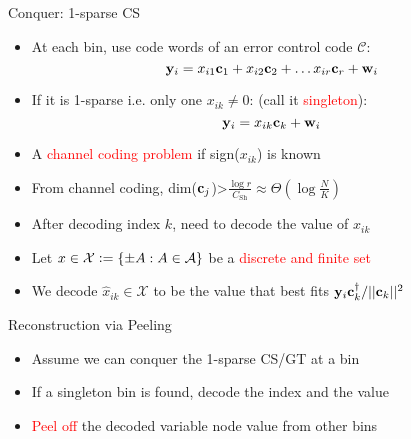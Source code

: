 \documentclass[final]{beamer}
\newlength{\twocolwid}
\newlength{\blockskip}
\begin{document}
\begin{frame}
\begin{columns}[t]
\begin{column}{\twocolwid}
    \begin{block}{\Large Conquer: 1-sparse CS}
	    \begin{itemize}
    		\item At each bin, use code words of an error control code $\mathcal{C}$:
		    	\begin{equation*}
				    \mathbf{y}_i=x_{i1}\mathbf{c}_1 +x_{i2}\mathbf{c}_{2}+\ldots x_{ir}\mathbf{c}_{r}+\mathbf{w}_i
			    \end{equation*}
    		\item If it is 1-sparse i.e. only one $x_{ik}\neq 0$: (call it \textcolor{red}{singleton}):
		        \begin{equation*}
				    \mathbf{y}_i=x_{ik}\mathbf{c}_k +\mathbf{w}_i
		        \end{equation*}
		    \item A \textcolor{red}{channel coding problem} if sign($x_{ik}$) is known
		    \item  From channel coding, dim($\mathbf{c}_j$)>$\frac{\log r}{C_{\text{Sh}}}\approx \Theta(\log \frac{N}{K})$ 
           \item After decoding index $k$, need to decode the value of $x_{ik}$
		    \item Let $x\in\mathcal{X}\mathrel{\mathop:}=\{\pm A: A\in \mathcal{A}\}$ be a \textcolor{red}{discrete and finite set}
		    \item We decode $\hat{x}_{ik}\in\mathcal{X}$ to be the value that best fits $\mathbf{y}_i\mathbf{c}_{k}^{\dagger}/||\mathbf{c}_{k}||^{2}$
    	\end{itemize}
    \end{block}      
\vspace{\blockskip}


 \begin{block}{\Large Reconstruction via Peeling}
    \begin{itemize}
	   \item Assume we can conquer the 1-sparse CS/GT at a bin
	   \item If a singleton bin is found, decode the index and the value
	   \item \textcolor{red}{Peel off} the decoded variable node value from other bins
   \end{itemize}
    

\end{block}
\end{column}
\end{columns}
\end{frame}
\end{document}

